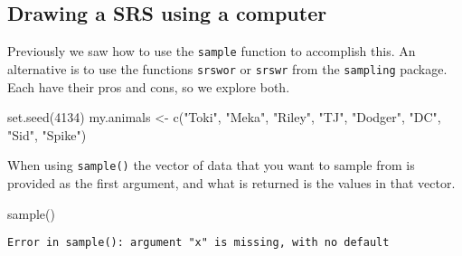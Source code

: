 \documentclass[
  letterpaper,
  DIV=11,
  numbers=noendperiod]{scrartcl}
\newenvironment{Shaded}{}{}
\newcommand{\DecValTok}[1]{\textcolor[rgb]{0.00,0.36,0.77}{#1}}
\newcommand{\FunctionTok}[1]{\textcolor[rgb]{0.44,0.26,0.76}{#1}}
\newcommand{\NormalTok}[1]{\textcolor[rgb]{0.14,0.16,0.18}{#1}}
\newcommand{\OtherTok}[1]{\textcolor[rgb]{0.44,0.26,0.76}{#1}}
\newcommand{\StringTok}[1]{\textcolor[rgb]{0.01,0.18,0.38}{#1}}
\begin{document}
\hypertarget{drawing-a-srs-using-a-computer}{%
\subsection{Drawing a SRS using a
computer}\label{drawing-a-srs-using-a-computer}}

Previously we saw how to use the \texttt{sample} function to accomplish
this. An alternative is to use the functions \texttt{srswor} or
\texttt{srswr} from the \texttt{sampling} package. Each have their pros
and cons, so we explore both.

\begin{tcolorbox}[enhanced jigsaw, toptitle=1mm, breakable, colframe=quarto-callout-tip-color-frame, colbacktitle=quarto-callout-tip-color!10!white, left=2mm, titlerule=0mm, bottomtitle=1mm, title=\textcolor{quarto-callout-tip-color}{\faLightbulb}\hspace{0.5em}{Example: Sampling from Dr.~D's animal names.}, bottomrule=.15mm, rightrule=.15mm, arc=.35mm, toprule=.15mm, colback=white, opacityback=0, leftrule=.75mm, coltitle=black, opacitybacktitle=0.6]

\begin{Shaded}
\begin{Highlighting}[]
\FunctionTok{set.seed}\NormalTok{(}\DecValTok{4134}\NormalTok{)}
\NormalTok{my.animals }\OtherTok{\textless{}{-}} \FunctionTok{c}\NormalTok{(}\StringTok{"Toki"}\NormalTok{, }\StringTok{"Meka"}\NormalTok{, }\StringTok{"Riley"}\NormalTok{, }\StringTok{"TJ"}\NormalTok{, }\StringTok{"Dodger"}\NormalTok{, }\StringTok{"DC"}\NormalTok{, }\StringTok{"Sid"}\NormalTok{, }\StringTok{"Spike"}\NormalTok{)}
\end{Highlighting}
\end{Shaded}

\end{tcolorbox}

When using \texttt{sample()} the vector of data that you want to sample
from is provided as the first argument, and what is returned is the
values in that vector.

\begin{Shaded}
\begin{Highlighting}[]
\FunctionTok{sample}\NormalTok{()}
\end{Highlighting}
\end{Shaded}

\begin{verbatim}
Error in sample(): argument "x" is missing, with no default
\end{verbatim}
\end{document}
